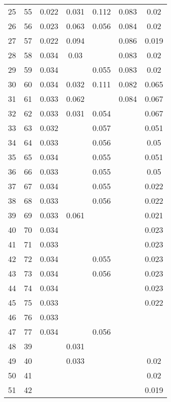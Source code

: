 \begin{longtable}{lp{7cm}ccccc}
  25 & 55 & 0.022 & 0.031 & 0.112 & 0.083 & 0.02 \\ 
  26 & 56 & 0.023 & 0.063 & 0.056 & 0.084 & 0.02 \\ 
  27 & 57 & 0.022 & 0.094 &  & 0.086 & 0.019 \\ 
  28 & 58 & 0.034 & 0.03 &  & 0.083 & 0.02 \\ 
  29 & 59 & 0.034 &  & 0.055 & 0.083 & 0.02 \\ 
  30 & 60 & 0.034 & 0.032 & 0.111 & 0.082 & 0.065 \\ 
  31 & 61 & 0.033 & 0.062 &  & 0.084 & 0.067 \\ 
  32 & 62 & 0.033 & 0.031 & 0.054 &  & 0.067 \\ 
  33 & 63 & 0.032 &  & 0.057 &  & 0.051 \\ 
  34 & 64 & 0.033 &  & 0.056 &  & 0.05 \\ 
  35 & 65 & 0.034 &  & 0.055 &  & 0.051 \\ 
  36 & 66 & 0.033 &  & 0.055 &  & 0.05 \\ 
  37 & 67 & 0.034 &  & 0.055 &  & 0.022 \\ 
  38 & 68 & 0.033 &  & 0.056 &  & 0.022 \\ 
  39 & 69 & 0.033 & 0.061 &  &  & 0.021 \\ 
  40 & 70 & 0.034 &  &  &  & 0.023 \\ 
  41 & 71 & 0.033 &  &  &  & 0.023 \\ 
  42 & 72 & 0.034 &  & 0.055 &  & 0.023 \\ 
  43 & 73 & 0.034 &  & 0.056 &  & 0.023 \\ 
  44 & 74 & 0.034 &  &  &  & 0.023 \\ 
  45 & 75 & 0.033 &  &  &  & 0.022 \\ 
  46 & 76 & 0.033 &  &  &  &  \\ 
  47 & 77 & 0.034 &  & 0.056 &  &  \\ 
  48 & 39 &  & 0.031 &  &  &  \\ 
  49 & 40 &  & 0.033 &  &  & 0.02 \\ 
  50 & 41 &  &  &  &  & 0.02 \\ 
  51 & 42 &  &  &  &  & 0.019 \\ 
   \bottomrule
\end{longtable}
